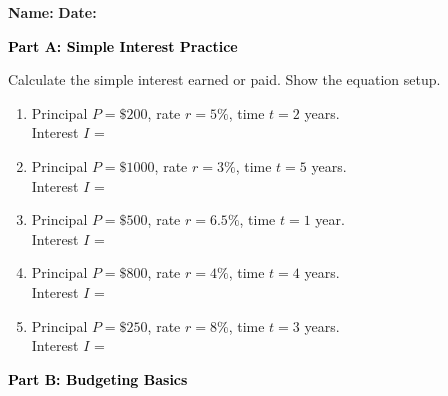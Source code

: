 \documentclass[12pt, letterpaper, fleqn]{article}
\newcommand{\blanklong}{\underline{\hspace{6.5cm}}}
\begin{document}
\textbf{Name:} \underline{\hspace{5cm}}
\hfill
\textbf{Date:} \underline{\hspace{3cm}}\\

\begin{tcolorbox}[colback=black!10]
    \large\textcolor{black}{\textbf{Part A: Simple Interest Practice}}
\end{tcolorbox}

\vspace{3mm}

\noindent
Calculate the simple interest earned or paid. Show the equation setup.

\vspace{5mm}

\begin{enumerate}[itemsep=2.0cm, leftmargin=0.6cm]
\item Principal $P = \$200$, rate $r = 5\%$, time $t = 2$ years. \\
Interest $I$ = \blanklong

\item Principal $P = \$1000$, rate $r = 3\%$, time $t = 5$ years. \\
Interest $I$ = \blanklong

\item Principal $P = \$500$, rate $r = 6.5\%$, time $t = 1$ year. \\
Interest $I$ = \blanklong

\item Principal $P = \$800$, rate $r = 4\%$, time $t = 4$ years. \\
Interest $I$ = \blanklong

\item Principal $P = \$250$, rate $r = 8\%$, time $t = 3$ years. \\
Interest $I$ = \blanklong
\end{enumerate}

\newpage

\begin{tcolorbox}[colback=black!10]
    \large\textcolor{black}{\textbf{Part B: Budgeting Basics}}
\end{tcolorbox}
\end{document}
